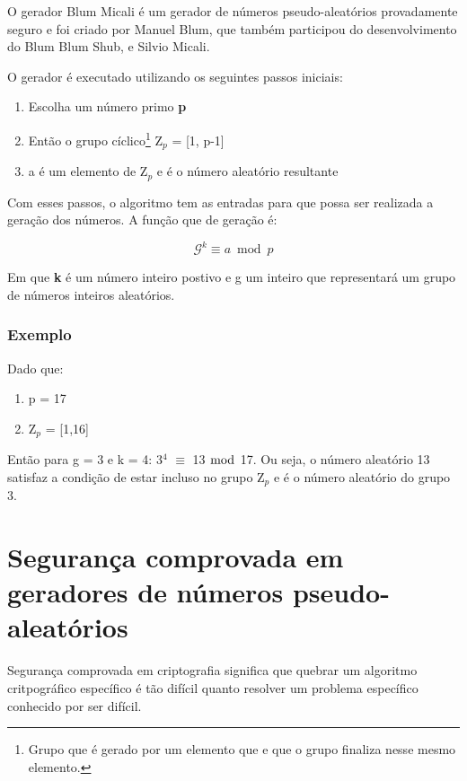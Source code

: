 O gerador Blum Micali é um gerador de números pseudo-aleatórios provadamente seguro e foi criado por Manuel Blum, que também participou do desenvolvimento do Blum Blum Shub, e Silvio Micali. ~\cite{josefin-martin}

O gerador é executado utilizando os seguintes passos iniciais:

\begin{enumerate}
	\item Escolha um número primo \textbf{p}
	\item Então o grupo cíclico\footnote{Grupo que é gerado por um elemento que e que o grupo finaliza nesse mesmo elemento.} Z$_p$ = [1, p-1]
	\item a é um elemento de Z$_p$ e é o número aleatório resultante
\end{enumerate}


Com esses passos, o algoritmo tem as entradas para que possa ser realizada a geração dos números. A função que de geração é:

\begin{equation}
	\mathcal{G}^k \equiv a \bmod p
\end{equation}

Em que \textbf{k} é um número inteiro postivo e g um inteiro que representará um grupo de números inteiros aleatórios.

\subsubsection{Exemplo}

Dado que:

\begin{enumerate}
	\item p = 17
	\item Z$_p$ = [1,16]
\end{enumerate}

Então para g = 3 e k = 4: 3$^4$ $\equiv$ 13 $\bmod$ 17. Ou seja, o número aleatório 13 satisfaz a condição de estar incluso no grupo Z$_p$ e é o número aleatório do grupo 3.

\section{Segurança comprovada em geradores de números pseudo-aleatórios}
\label{security-of-prng}

Segurança comprovada em criptografia significa que quebrar um algoritmo critpográfico específico é tão difícil quanto resolver um problema específico conhecido por ser difícil. ~\cite{josefin-martin}

